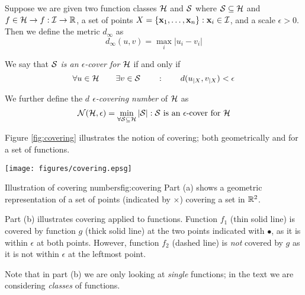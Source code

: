 \begin{definition}
\label{def:covering}
\label{def:covering numbers}
Suppose we are given two function classes $\mathcal{H}$ and $\mathcal{S}$ where $\mathcal{S}
\subseteq \mathcal{H}$ and $f \in \mathcal{H} \rightarrow f : \mathcal{I} \rightarrow
\mathbb{R}$, a set of points $X = \{\mathbf{x}_1, \ldots, \mathbf{x}_n\} : \mathbf{x}_i \in
\mathcal{I}$, and a scale $\epsilon > 0$.  Then we define the metric
$d_{\infty}$ as 
%
\begin{equation}
d_{\infty}(u, v) = \max_{i} |u_i - v_i|
\end{equation}

We say that \emph{$\mathcal{S}$ is an $\epsilon$-cover for $\mathcal{H}$} if
and only if 
%
\begin{equation}
\forall u \in \mathcal{H} \qquad \exists v \in \mathcal{S} \qquad : \qquad
d(u_{|X}, v_{|X}) < \epsilon
\end{equation}

We further define the \emph{$d$ $\epsilon$-covering number} of $\mathcal{H}$
as
% 
\begin{equation}
\mathcal{N}({\mathcal{H}}, {\epsilon}) = \min_{\forall \mathcal{S} \subseteq
\mathcal{H}}|\mathcal{S}| : \mbox{$\mathcal{S}$ is an $\epsilon$-cover for $\mathcal{H}$}
\end{equation}
\end{definition}

Figure \ref{fig:covering} illustrates the notion of covering; both
geometrically and for a set of functions.

\begin{linefigure}
\begin{center}
\texttt{[image: figures/covering.epsg]}
\end{center}
\begin{capt}{Illustration of covering numbers}{fig:covering}
Part (a) shows a geometric representation of a set of points
(indicated by $\times$) covering a set in $\mathbb{R}^2$.

Part (b) illustrates covering applied to functions.  Function $f_1$
(thin solid line) is covered by function $g$ (thick solid line) at the two
points indicated with $\bullet$, as it is within $\epsilon$ at both
points. However, function $f_2$ (dashed line) is \emph{not} covered by
$g$ as it is not within $\epsilon$ at the leftmost point.

Note that in part (b) we are only looking at \emph{single} functions;
in the text we are considering \emph{classes} of functions.
\end{capt}
\end{linefigure}

